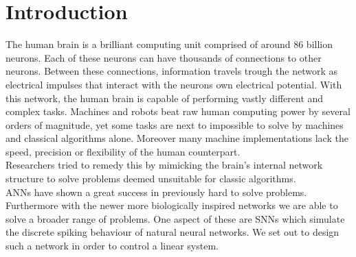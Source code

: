 \chapter{Introduction}


The human brain is a brilliant computing unit comprised of around 86 billion\cite{azevedo_equal_2009} neurons. Each of these neurons can have thousands of connections to other neurons. Between these connections, information travels trough the network as electrical impulses that interact with the neurons own electrical potential. With this network, the human brain is capable of performing vastly different and complex tasks. Machines and robots beat raw human computing power by several orders of magnitude, yet some tasks are next to impossible to solve by machines and classical algorithms alone. Moreover many machine implementations lack the speed, precision or flexibility of the human counterpart.\\
Researchers tried to remedy this by mimicking the brain's internal network structure to solve problems deemed unsuitable for classic algorithms.\\
\acp{ANN} have shown a great success in previously hard to solve problems.\\
Furthermore with the newer more biologically inspired networks we are able to solve a broader range of problems. One aspect of these are \acp{SNN} which simulate the discrete spiking behaviour of natural neural networks. We set out to design such a network in order to control a linear system.


